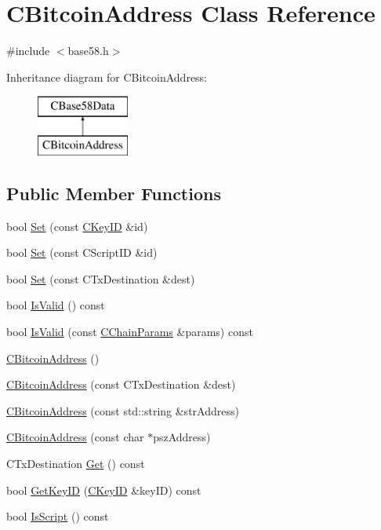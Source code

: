 \hypertarget{class_c_bitcoin_address}{}\section{C\+Bitcoin\+Address Class Reference}
\label{class_c_bitcoin_address}


{\ttfamily \#include $<$base58.\+h$>$}

Inheritance diagram for C\+Bitcoin\+Address\+:\begin{figure}[H]
\begin{center}
\leavevmode
\includegraphics[height=2.000000cm]{class_c_bitcoin_address}
\end{center}
\end{figure}
\subsection*{Public Member Functions}
\begin{DoxyCompactItemize}
\item 
bool \hyperlink{class_c_bitcoin_address_abe1614f9ecd143ae69256d65c5edbcab}{Set} (const \hyperlink{class_c_key_i_d}{C\+Key\+I\+D} \&id)
\item 
bool \hyperlink{class_c_bitcoin_address_abb974c40304444b0f14a005ddb7dac03}{Set} (const C\+Script\+I\+D \&id)
\item 
bool \hyperlink{class_c_bitcoin_address_a819dfc6a4866832e2cd2e51c1a245d80}{Set} (const C\+Tx\+Destination \&dest)
\item 
bool \hyperlink{class_c_bitcoin_address_a3861fc29b82dba7d8bc8430ca461a20f}{Is\+Valid} () const 
\item 
bool \hyperlink{class_c_bitcoin_address_a9597ff4b2b7089364cde253a5fdd4f76}{Is\+Valid} (const \hyperlink{class_c_chain_params}{C\+Chain\+Params} \&params) const 
\item 
\hyperlink{class_c_bitcoin_address_ae1870e2f346a1f9968a201864fbdf010}{C\+Bitcoin\+Address} ()
\item 
\hyperlink{class_c_bitcoin_address_a4c9c03791561557b8a1926567456712e}{C\+Bitcoin\+Address} (const C\+Tx\+Destination \&dest)
\item 
\hyperlink{class_c_bitcoin_address_a23f7116fe3a89ab9a551f1d8c29469da}{C\+Bitcoin\+Address} (const std\+::string \&str\+Address)
\item 
\hyperlink{class_c_bitcoin_address_ac0fd8d46f815948d471a8896997a3211}{C\+Bitcoin\+Address} (const char $\ast$psz\+Address)
\item 
C\+Tx\+Destination \hyperlink{class_c_bitcoin_address_a46d632250c4b47727f8e9b2f8141fd69}{Get} () const 
\item 
bool \hyperlink{class_c_bitcoin_address_a077afe9cf27a69dd50be1339310764a2}{Get\+Key\+I\+D} (\hyperlink{class_c_key_i_d}{C\+Key\+I\+D} \&key\+I\+D) const 
\item 
bool \hyperlink{class_c_bitcoin_address_a2e605ae688b2064155a9978104a9099d}{Is\+Script} () const 
\end{DoxyCompactItemize}

